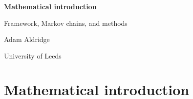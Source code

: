 \documentclass[11pt]{report}
\begin{document}
\begin{titlepage}
\centering
\vspace*{4cm}
{\LARGE\bfseries Mathematical introduction\par}
\vspace{6pt}
{\large Framework, Markov chains, and methods\par}
\vspace{2.5cm}
{\large Adam Aldridge\par}
\vspace{6pt}
{\ChM\par}
\vspace{4pt}
{University of Leeds\par}
\end{titlepage}

\tableofcontents
\clearpage

\chapter{Mathematical introduction}
\label{m:ch:math-intro}






\FloatBarrier
\begingroup
\footnotesize


\endgroup
\end{document}
